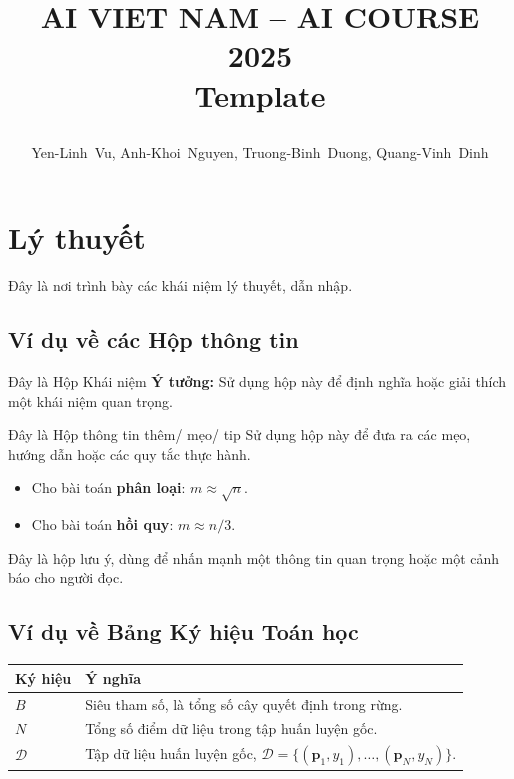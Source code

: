 \documentclass[12pt]{article}
\title{%
  \begin{center}
        \Large {AI VIET NAM -- AI COURSE 2025}\\[.5ex]  
        \Huge \textbf{Template}\\[.5ex]
  \end{center}
}
\author{
        \begin{minipage}{\textwidth}
        \centering
        {
          Yen-Linh~Vu,\quad
          Anh-Khoi~Nguyen,\quad
          Truong-Binh~Duong,\quad
          Quang-Vinh~Dinh
        }\\
      \end{minipage}
    }
\date{}
\begin{document}
\maketitle
\vspace{-3.5em}
\section{Lý thuyết}
\label{section:theory}

Đây là nơi trình bày các khái niệm lý thuyết, dẫn nhập.

\subsection{Ví dụ về các Hộp thông tin}

\begin{conceptbox}{Đây là Hộp Khái niệm \faRandom}
    \textbf{Ý tưởng:} Sử dụng hộp này để định nghĩa hoặc giải thích một khái niệm quan trọng.
\end{conceptbox}

\begin{guidelinebox}{Đây là Hộp thông tin thêm/ mẹo/ tip \faLightbulb}
    Sử dụng hộp này để đưa ra các mẹo, hướng dẫn hoặc các quy tắc thực hành.
    \begin{itemize}
        \item Cho bài toán \textbf{phân loại}: $m \approx \sqrt{n}$.
        \item Cho bài toán \textbf{hồi quy}: $m \approx n/3$.
    \end{itemize}
\end{guidelinebox}

\begin{notebox}
    Đây là hộp lưu ý, dùng để nhấn mạnh một thông tin quan trọng hoặc một cảnh báo cho người đọc.
\end{notebox}


\subsection{Ví dụ về Bảng Ký hiệu Toán học}

\begin{tcolorbox}[
    colback=white, colframe=aivnGreen, boxrule=1pt,
    title=\textbf{Bảng Ký hiệu Toán học}, fonttitle=\bfseries\color{white},
    halign title=center, colbacktitle=aivnGreen, arc=5pt
]
\renewcommand{\arraystretch}{1.5}
\begin{tabular}{>{\centering\arraybackslash}p{2.5cm} p{12cm}}
    \textbf{Ký hiệu} & \textbf{Ý nghĩa} \\
    \midrule
    $B$ & Siêu tham số, là tổng số cây quyết định trong rừng. \\
    $N$ & Tổng số điểm dữ liệu trong tập huấn luyện gốc. \\
    $\mathcal{D}$ & Tập dữ liệu huấn luyện gốc, $\mathcal{D} = \{(\mathbf{p}_1, y_1), \dots, (\mathbf{p}_N, y_N)\}$. \\
\end{tabular}
\end{tcolorbox}
\end{document}
